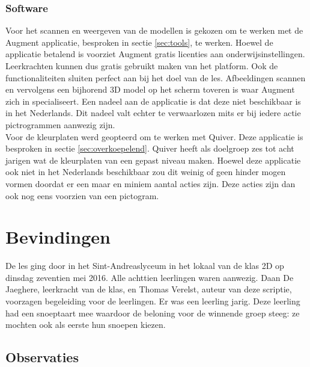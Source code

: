 \documentclass[pdftex,a4paper,12pt,twoside]{report}
\begin{document}
\subsubsection{Software}
Voor het scannen en weergeven van de modellen is gekozen om te werken met de Augment applicatie, besproken in sectie \ref{sec:tools}, te werken. Hoewel de applicatie betalend is voorziet Augment gratis licenties aan onderwijsinstellingen. Leerkrachten kunnen dus gratis gebruikt maken van het platform. Ook de functionaliteiten sluiten perfect aan bij het doel van de les. Afbeeldingen scannen en vervolgens een bijhorend 3D model op het scherm toveren is waar Augment zich in specialiseert. Een nadeel aan de applicatie is dat deze niet beschikbaar is in het Nederlands. Dit nadeel valt echter te verwaarlozen mits er bij iedere actie pictrogrammen aanwezig zijn. \\

Voor de kleurplaten werd geopteerd om te werken met Quiver. Deze applicatie is besproken in sectie \ref{sec:overkoepelend}. Quiver heeft als doelgroep zes tot acht jarigen wat de kleurplaten van een gepast niveau maken. Hoewel deze applicatie ook niet in het Nederlands beschikbaar zou dit weinig of geen hinder mogen vormen doordat er een maar en miniem aantal acties zijn. Deze acties zijn dan ook nog eens voorzien van een pictogram. \\

\section{Bevindingen}
De les ging door in het Sint-Andreaslyceum in het lokaal van de klas 2D op dinsdag zeventien mei 2016. Alle achttien leerlingen waren aanwezig. Daan De Jaeghere, leerkracht van de klas, en Thomas Verelst, auteur van deze scriptie, voorzagen begeleiding voor de leerlingen. Er was een leerling jarig. Deze leerling had een snoeptaart mee waardoor de beloning voor de winnende groep steeg: ze mochten ook als eerste hun snoepen kiezen. \\


\subsection{Observaties}
\end{document}
